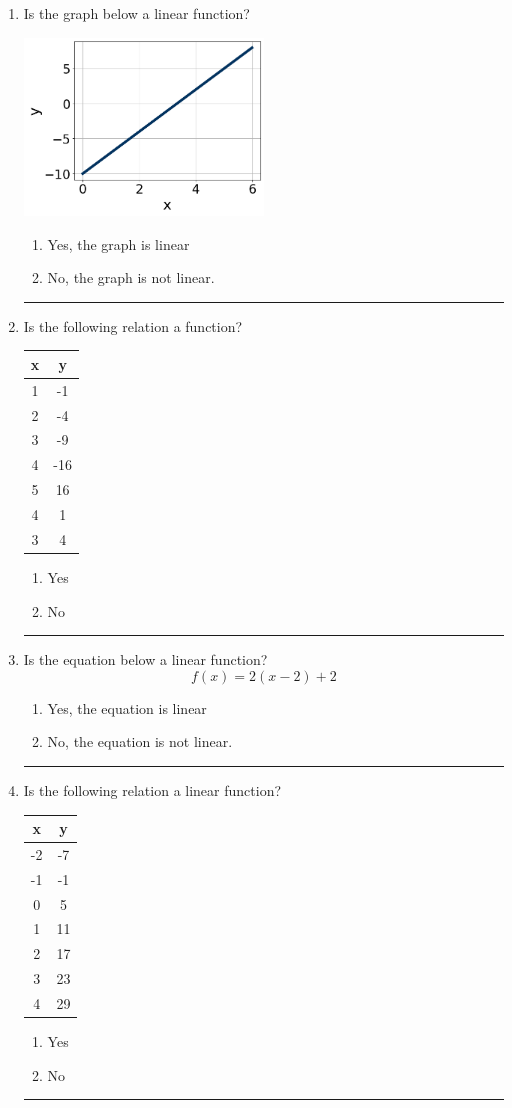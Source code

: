 \documentclass[14pt]{extbook}
\newcommand{\litem}[1]{\item#1\hspace*{-1cm}\rule{\textwidth}{0.4pt}}
\begin{document}
\begin{enumerate}
{\begin{enumerate}[label=\Alph*.]
\end{enumerate} }
\litem{
Is the graph below a linear function?
\begin{center}
    \includegraphics[width=0.5\textwidth]{../Figures/MA_8_F_1_2_graphS.png}
\end{center}
\begin{enumerate}[label=\Alph*.]
\item Yes, the graph is linear
\item No, the graph is not linear.

\end{enumerate} }
\litem{
Is the following relation a function?

\begin{tabular}{c|c}
x &y\tabularnewline \hline
1 &-1\tabularnewline \hline
2 &-4\tabularnewline \hline
3 &-9\tabularnewline \hline
4 &-16\tabularnewline \hline
5 &16\tabularnewline \hline
4 &1\tabularnewline \hline
3 &4\end{tabular}\begin{enumerate}[label=\Alph*.]
\item Yes
\item No

\end{enumerate} }
\litem{
Is the equation below a linear function?\[ f(x) = 2(x -2)+2 \]\begin{enumerate}[label=\Alph*.]
\item Yes, the equation is linear
\item No, the equation is not linear.

\end{enumerate} }
\litem{
Is the following relation a linear function?

\begin{tabular}{c|c}
x &y\tabularnewline \hline
-2 &-7\tabularnewline \hline
-1 &-1\tabularnewline \hline
0 &5\tabularnewline \hline
1 &11\tabularnewline \hline
2 &17\tabularnewline \hline
3 &23\tabularnewline \hline
4 &29\end{tabular}\begin{enumerate}[label=\Alph*.]
\item Yes
\item No


\end{enumerate}}
\end{enumerate}
\end{document}
